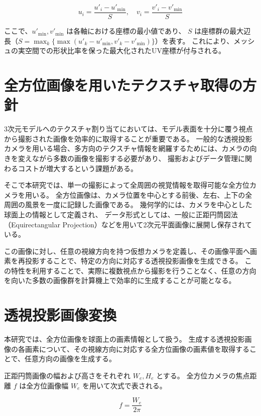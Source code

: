 \begin{equation}
  u_i = \frac{u'_i - u'_{\min}}{S}, \quad v_i = \frac{v'_i - v'_{\min}}{S}
\end{equation}

ここで、$u'_{\min}, v'_{\min}$ は各軸における座標の最小値であり、
$S$ は座標群の最大辺長（$S = \max_k \{ \max(u'_k - u'_{\min}, v'_k - v'_{\min}) \}$）を表す。
これにより、メッシュの実空間での形状比率を保った最大化されたUV座標が付与される。


\section{全方位画像を用いたテクスチャ取得の方針}

3次元モデルへのテクスチャ割り当てにおいては、モデル表面を十分に覆う視点から撮影された画像を効率的に取得することが重要である。 
一般的な透視投影カメラを用いる場合、多方向のテクスチャ情報を網羅するためには、カメラの向きを変えながら多数の画像を撮影する必要があり、
撮影およびデータ管理に関わるコストが増大するという課題がある。

そこで本研究では、単一の撮影によって全周囲の視覚情報を取得可能な全方位カメラを用いる。
全方位画像は、カメラ位置を中心とする前後、左右、上下の全周囲の風景を一度に記録した画像である。
幾何学的には、カメラを中心とした球面上の情報として定義され、
データ形式としては、一般に正距円筒図法（Equirectangular Projection）などを用いて2次元平面画像に展開し保存されている。

この画像に対し、任意の視線方向を持つ仮想カメラを定義し、その画像平面へ画素を再投影することで、特定の方向に対応する透視投影画像を生成できる。
この特性を利用することで、実際に複数視点から撮影を行うことなく、任意の方向を向いた多数の画像群を計算機上で効率的に生成することが可能となる。


\section{透視投影画像変換}

本研究では、全方位画像を球面上の画素情報として扱う。 
生成する透視投影画像の各画素について、その視線方向に対応する全方位画像の画素値を取得することで、任意方向の画像を生成する。

正距円筒画像の幅および高さをそれぞれ $W_e, H_e$ とする。
全方位カメラの焦点距離 $f$ は全方位画像幅 $W_e$ を用いて次式で表される。

\begin{equation}
f = \frac{W_e}{2 \pi}
\end{equation}

